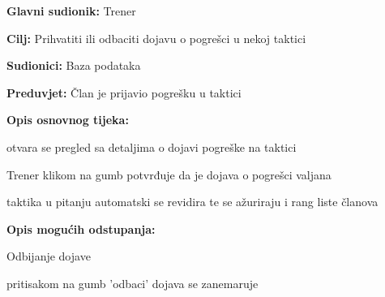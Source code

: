 					\noindent {}
					\begin{packed_item}
	
						\item \textbf{Glavni sudionik: }Trener
						\item  \textbf{Cilj: } Prihvatiti ili odbaciti dojavu o pogrešci u nekoj taktici
						\item  \textbf{Sudionici: } Baza podataka
						\item  \textbf{Preduvjet: } Član je prijavio pogrešku u taktici
						\item  \textbf{Opis osnovnog tijeka:}
						
						\item[] \begin{packed_enum}
	
							\item otvara se pregled sa detaljima o dojavi pogreške na taktici
							\item Trener klikom na gumb potvrđuje da je dojava o pogrešci valjana
							\item taktika u pitanju automatski se revidira te se ažuriraju i rang liste članova
							
						\end{packed_enum}
						
						\item  \textbf{Opis mogućih odstupanja:}
						
						\item[] \begin{packed_item}
	
							\item Odbijanje dojave
							\item[] \begin{packed_enum}
								
								\item pritisakom na gumb 'odbaci' dojava se zanemaruje
								
							\end{packed_enum}
							
							
						\end{packed_item}
					\end{packed_item}
					
